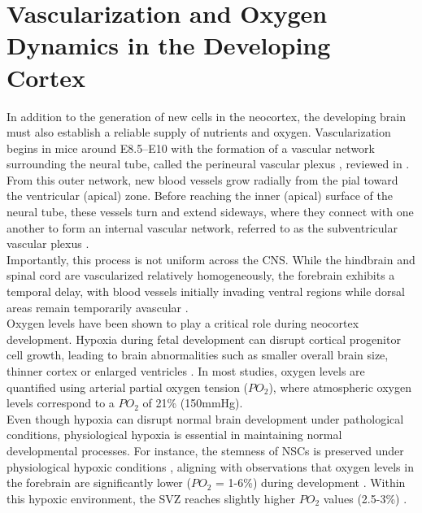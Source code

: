 \section{Vascularization and Oxygen Dynamics in the Developing Cortex}

In addition to the generation of new cells in the neocortex, the developing brain must also establish a reliable supply of nutrients and oxygen. Vascularization begins in mice around E8.5–E10 with the formation of a vascular network surrounding the neural tube, called the perineural vascular plexus \citep{HOGANNeuralTubePatterns2004},
reviewed in \citep{JAMESNeuronalActionDeveloping2011}. From this outer network, new blood vessels grow radially from the pial toward the ventricular (apical) zone. Before reaching the inner (apical) surface of the neural tube, these vessels turn and extend sideways, where they connect with one another to form an internal vascular network, referred to as the subventricular vascular plexus \citep{TATAVascularisationCentralNervous2015, FANTINNRP1ActsCell2013}.
\\

Importantly, this process is not uniform across the CNS. While the hindbrain and spinal cord are vascularized relatively homogeneously, the forebrain exhibits a temporal delay, with blood vessels initially invading ventral regions while dorsal areas remain temporarily avascular \citep{VASUDEVANCompartmentspecificTranscriptionFactors2008}.
\\

Oxygen levels have been shown to play a critical role during neocortex development. Hypoxia during fetal development can disrupt cortical progenitor cell growth, leading to brain abnormalities such as smaller overall brain size, thinner cortex or enlarged ventricles \citep{piesovaImpactPerinatalHypoxia2020}.
In most studies, oxygen levels are quantified using  arterial partial oxygen tension ($PO_2$), where atmospheric oxygen levels correspond to a $PO_2$ of 21\% (150mmHg). 
\\

Even though hypoxia can disrupt normal brain development under pathological conditions, physiological hypoxia is essential in maintaining normal developmental processes. For instance, the stemness of NSCs is preserved under physiological hypoxic conditions \citep{EZASHILowO2Tensions2005}, aligning with observations that oxygen levels in the forebrain are significantly lower ($PO_2$ = 1-6\%) during development \citep{LEEDeterminationHypoxicRegion2001,ZHANGOxygenKeyFactor2011}.
Within this hypoxic environment, the SVZ reaches slightly higher $PO_2$ values (2.5-3\%) \citep{SANTILLIMildHypoxiaEnhances2010}.
\\

